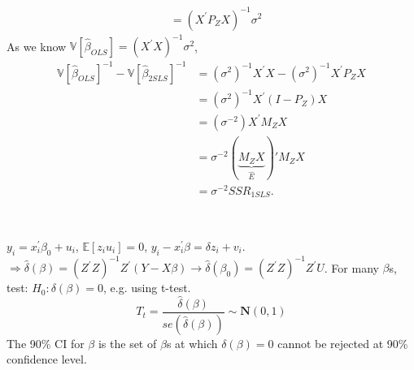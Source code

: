 \begin{definition}
\begin{enumerate}
\begin{align*}
            &= \left(X^{\prime} P_Z X\right)^{-1} \sigma^2
        \end{align*}
        As we know $\mathbb{V}[\hat{\beta}_{OLS}] = (X^{\prime} X)^{-1} \sigma^2$, 
        \begin{align*}
            \mathbb{V}\left[\hat{\beta}_{OLS}\right]^{-1} - \mathbb{V}\left[\hat{\beta}_{2SLS} \right]^{-1} &= (\sigma^2)^{-1} X^{\prime} X - (\sigma^2)^{-1} X^{\prime} P_Z X \\
            &= (\sigma^2)^{-1} X^{\prime} (I - P_Z) X \\
            &= (\sigma^{-2}) X^{\prime} M_Z X \\
            &= \sigma^{-2} (\underset{\hat{E}}{\underbrace{M_Z X}})' M_Z X \\
            &= \sigma^{-2} SSR_{1SLS}.
        \end{align*}
    \end{enumerate}
\end{definition}

\begin{theorem}
    \
    
    $y_i = x_i^{\prime} \beta_0 + u_i$, $\mathbb{E}[z_i u_i] = 0$,
    $y_i - x_i^{\prime} \beta = \delta z_i + v_i$.
    $\Rightarrow \hat{\delta}(\beta) = (Z^{\prime} Z)^{-1} Z^{\prime} (Y - X \beta) \rightarrow\hat{\delta}(\beta_0)= (Z^{\prime} Z)^{-1}Z^{\prime} U$.
    For many $\beta$s, test: $H_0: \delta(\beta) = 0$, e.g. using t-test.
    \[T_t = \frac{\hat{\delta}(\beta)}{se(\hat{\delta}(\beta))} \sim \mathbf{N}(0,1)\]
    The 90\% CI for $\beta$ is the set of $\beta$s at which $\delta(\beta) = 0$ cannot be rejected at 90\% confidence level.
\end{theorem}